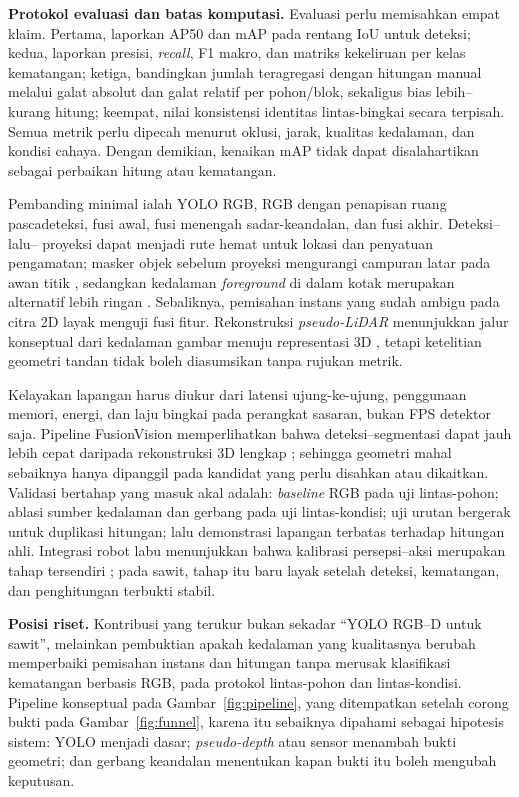 \textbf{Protokol evaluasi dan batas komputasi.} Evaluasi perlu memisahkan
empat klaim. Pertama, laporkan AP50 dan mAP pada rentang IoU untuk deteksi;
kedua, laporkan presisi, \textit{recall}, F1 makro, dan matriks kekeliruan
per kelas kematangan; ketiga, bandingkan jumlah teragregasi dengan hitungan
manual melalui galat absolut dan galat relatif per pohon/blok, sekaligus
bias lebih--kurang hitung; keempat, nilai konsistensi identitas lintas-bingkai
secara terpisah. Semua metrik perlu dipecah menurut oklusi, jarak, kualitas
kedalaman, dan kondisi cahaya. Dengan demikian, kenaikan mAP tidak dapat
disalahartikan sebagai perbaikan hitung atau kematangan.

Pembanding minimal ialah YOLO RGB, RGB dengan penapisan ruang pascadeteksi,
fusi awal, fusi menengah sadar-keandalan, dan fusi akhir. Deteksi--lalu--
proyeksi dapat menjadi rute hemat untuk lokasi dan penyatuan pengamatan;
masker objek sebelum proyeksi mengurangi campuran latar pada awan titik
\cite{elamraoui2024fusionvision}, sedangkan kedalaman \textit{foreground}
di dalam kotak merupakan alternatif lebih ringan \cite{chen2023depthyolo}.
Sebaliknya, pemisahan instans yang sudah ambigu pada citra 2D layak menguji
fusi fitur. Rekonstruksi \textit{pseudo-LiDAR} menunjukkan jalur konseptual
dari kedalaman gambar menuju representasi 3D \cite{wang2019pseudolidar},
tetapi ketelitian geometri tandan tidak boleh diasumsikan tanpa rujukan metrik.

Kelayakan lapangan harus diukur dari latensi ujung-ke-ujung, penggunaan memori,
energi, dan laju bingkai pada perangkat sasaran, bukan FPS detektor saja.
Pipeline FusionVision memperlihatkan bahwa deteksi--segmentasi dapat jauh lebih
cepat daripada rekonstruksi 3D lengkap \cite{elamraoui2024fusionvision};
sehingga geometri mahal sebaiknya hanya dipanggil pada kandidat yang perlu
disahkan atau dikaitkan. Validasi bertahap yang masuk akal adalah: \textit{baseline}
RGB pada uji lintas-pohon; ablasi sumber kedalaman dan gerbang pada uji
lintas-kondisi; uji urutan bergerak untuk duplikasi hitungan; lalu demonstrasi
lapangan terbatas terhadap hitungan ahli. Integrasi robot labu menunjukkan
bahwa kalibrasi persepsi--aksi merupakan tahap tersendiri \cite{ito2024pumpkin};
pada sawit, tahap itu baru layak setelah deteksi, kematangan, dan penghitungan
terbukti stabil.

\textbf{Posisi riset.} Kontribusi yang terukur bukan sekadar ``YOLO RGB--D
untuk sawit'', melainkan pembuktian apakah kedalaman yang kualitasnya berubah
memperbaiki pemisahan instans dan hitungan tanpa merusak klasifikasi kematangan
berbasis RGB, pada protokol lintas-pohon dan lintas-kondisi. Pipeline konseptual
pada Gambar~\ref{fig:pipeline}, yang ditempatkan setelah corong bukti pada
Gambar~\ref{fig:funnel}, karena itu sebaiknya dipahami sebagai hipotesis sistem:
YOLO menjadi dasar; \textit{pseudo-depth} atau sensor menambah bukti geometri;
dan gerbang keandalan menentukan kapan bukti itu boleh mengubah keputusan.

